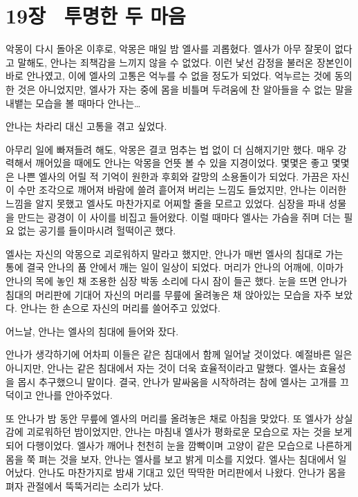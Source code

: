 
\chapter[19장  투명한 두 마음][19장\hspace*{.5em}투명한 두 마음]{19장 \ 투명한 두 마음}



악몽이 다시 돌아온 이후로, 악몽은 매일 밤 엘사를 괴롭혔다. 엘사가 아무 잘못이 없다고 말해도, 안나는 죄책감을 느끼지 않을 수 없었다. 이런 낯선 감정을 불러온 장본인이 바로 안나였고, 이에 엘사의 고통은 억누를 수 없을 정도가 되었다. 억누르는 것에 동의한 것은 아니었지만, 엘사가 자는 중에 몸을 비틀며 두려움에 찬 알아들을 수 없는 말을 내뱉는 모습을 볼 때마다 안나는\ldots

안나는 차라리 대신 고통을 겪고 싶었다.

아무리 일에 빠져들려 해도, 악몽은 결코 멈추는 법 없이 더 심해지기만 했다. 매우 강력해서 깨어있을 때에도 안나는 악몽을 언뜻 볼 수 있을 지경이었다. 몇몇은 좋고 몇몇은 나쁜 엘사의 어릴 적 기억이 원한과 후회와 갈망의 소용돌이가 되었다. 가끔은 자신이 수만 조각으로 깨어져 바람에 쓸려 흩어져 버리는 느낌도 들었지만, 안나는 이러한 느낌을 알지 못했고 엘사도 마찬가지로 어찌할 줄을 모르고 있었다. 심장을 파내 성물을 만드는 광경이 이 사이를 비집고 들어왔다. 이럴 때마다 엘사는 가슴을 쥐며 더는 필요 없는 공기를 들이마시려 헐떡이곤 했다.

엘사는 자신의 악몽으로 괴로워하지 말라고 했지만, 안나가 매번 엘사의 침대로 가는 통에 결국 안나의 품 안에서 깨는 일이 일상이 되었다. 머리가 안나의 어깨에, 이마가 안나의 목에 놓인 채 조용한 심장 박동 소리에 다시 잠이 들곤 했다. 눈을 뜨면 안나가 침대의 머리판에 기대어 자신의 머리를 무릎에 올려놓은 채 앉아있는 모습을 자주 보았다. 안나는 한 손으로 자신의 머리를 쓸어주고 있었다.

어느날, 안나는 엘사의 침대에 들어와 잤다.

안나가 생각하기에 어차피 이들은 같은 침대에서 함께 일어날 것이었다. 예절바른 일은 아니지만, 안나는 같은 침대에서 자는 것이 더욱 효율적이라고 말했다. 엘사는 효율성을 몹시 추구했으니 말이다. 결국, 안나가 말싸움을 시작하려는 참에 엘사는 고개를 끄덕이고 안나를 안아주었다.

또 안나가 밤 동안 무릎에 엘사의 머리를 올려놓은 채로 아침을 맞았다. 또 엘사가 상실감에 괴로워하던 밤이었지만, 안나는 마침내 엘사가 평화로운 모습으로 자는 것을 보게 되어 다행이었다. 엘사가 깨어나 천천히 눈을 깜빡이며 고양이 같은 모습으로 나른하게 몸을 쭉 펴는 것을 보자, 안나는 엘사를 보고 밝게 미소를 지었다. 엘사는 침대에서 일어났다. 안나도 마찬가지로 밤새 기대고 있던 딱딱한 머리판에서 나왔다. 안나가 몸을 펴자 관절에서 뚝뚝거리는 소리가 났다.

